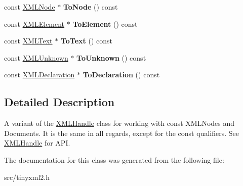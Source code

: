 \begin{DoxyCompactItemize}
\item 
const \hyperlink{classtinyxml2_1_1_x_m_l_node}{X\+M\+L\+Node} $\ast$ {\bfseries To\+Node} () const \hypertarget{classtinyxml2_1_1_x_m_l_const_handle_a95d0256318c10c3f75fa5f8ffb3e4bc1}{}\label{classtinyxml2_1_1_x_m_l_const_handle_a95d0256318c10c3f75fa5f8ffb3e4bc1}

\item 
const \hyperlink{classtinyxml2_1_1_x_m_l_element}{X\+M\+L\+Element} $\ast$ {\bfseries To\+Element} () const \hypertarget{classtinyxml2_1_1_x_m_l_const_handle_a5a48adefc2a5e70d4ce5b55692a0e2f9}{}\label{classtinyxml2_1_1_x_m_l_const_handle_a5a48adefc2a5e70d4ce5b55692a0e2f9}

\item 
const \hyperlink{classtinyxml2_1_1_x_m_l_text}{X\+M\+L\+Text} $\ast$ {\bfseries To\+Text} () const \hypertarget{classtinyxml2_1_1_x_m_l_const_handle_ad86ca7dbb20d0495ae357fe7a866e0be}{}\label{classtinyxml2_1_1_x_m_l_const_handle_ad86ca7dbb20d0495ae357fe7a866e0be}

\item 
const \hyperlink{classtinyxml2_1_1_x_m_l_unknown}{X\+M\+L\+Unknown} $\ast$ {\bfseries To\+Unknown} () const \hypertarget{classtinyxml2_1_1_x_m_l_const_handle_acb358a329e54fa204ed2d0b181566828}{}\label{classtinyxml2_1_1_x_m_l_const_handle_acb358a329e54fa204ed2d0b181566828}

\item 
const \hyperlink{classtinyxml2_1_1_x_m_l_declaration}{X\+M\+L\+Declaration} $\ast$ {\bfseries To\+Declaration} () const \hypertarget{classtinyxml2_1_1_x_m_l_const_handle_a5de0c175845bc30a6f9b3d88d8877eaf}{}\label{classtinyxml2_1_1_x_m_l_const_handle_a5de0c175845bc30a6f9b3d88d8877eaf}

\end{DoxyCompactItemize}


\subsection{Detailed Description}
A variant of the \hyperlink{classtinyxml2_1_1_x_m_l_handle}{X\+M\+L\+Handle} class for working with const X\+M\+L\+Nodes and Documents. It is the same in all regards, except for the \textquotesingle{}const\textquotesingle{} qualifiers. See \hyperlink{classtinyxml2_1_1_x_m_l_handle}{X\+M\+L\+Handle} for A\+PI. 

The documentation for this class was generated from the following file\+:\begin{DoxyCompactItemize}
\item 
src/tinyxml2.\+h\end{DoxyCompactItemize}
